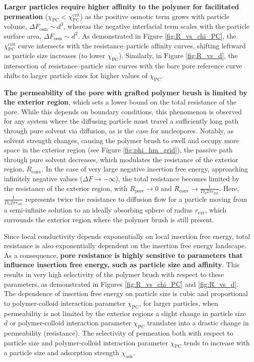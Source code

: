 \documentclass[12pt, a4paper]{article}
\begin{document}
\textbf{Larger particles require higher affinity to the polymer for facilitated permeation} ($\chi_{\text{PC}} < \chi^{\text{crit}}_{\text{PC}}$) as the positive osmotic term grows with particle volume, $\Delta F_{\text{osm}} \sim d^3$, whereas the negative interfacial term scales with the particle surface area, $\Delta F_{\text{osm}} \sim d^2$.
As demonstrated in Figure \ref{fig:R_vs_chi_PC}, the $\chi^{\text{crit}}_{\text{PC}}$ curve intersects with the resistance–particle affinity curves, shifting leftward as particle size increases (to lower $\chi_{\text{PC}}$).
Similarly, in Figure \ref{fig:R_vs_d}, the intersection of resistance–particle size curves with the bare pore reference curve shifts to larger particle sizes for higher values of $\chi_{\text{PC}}$.

\textbf{The permeability of the pore with grafted polymer brush is limited by the exterior region}, which sets a lower bound on the total resistance of the pore.
While this depends on boundary conditions, this phenomenon is observed for any system where the diffusing particle must travel a sufficiently long path through pure solvent via diffusion, as is the case for nucleopores.%
Notably, as solvent strength changes, causing the polymer brush to swell and occupy more space in the exterior region (see Figure \ref{fig:phi_hm_grid}), the passive path through pure solvent decreases, which modulates the resistance of the exterior region, $R_{\text{conv}}$.
In the case of very large negative insertion free energy, approaching infinitely negative values ($\Delta F \to -\infty$), the total resistance becomes limited by the resistance of the exterior region, with $R_{\text{pore}} \to 0$ and $R_{\text{conv}} \to \frac{1}{D_0 2 \pi r_{\text{ext}}}$.
Here, $\frac{1}{D_0 2 \pi r_{\text{ext}}}$ represents twice the resistance to diffusion flow for a particle moving from a semi-infinite solution to an ideally absorbing sphere of radius $r_{\text{ext}}$, which surrounds the exterior region where the polymer brush is still present.

Since local conductivity depends exponentially on local insertion free energy, total resistance is also exponentially dependent on the insertion free energy landscape.
As a consequence, \textbf{pore resistance is highly sensitive to parameters that influence insertion free energy, such as particle size and affinity}.
This results in very high selectivity of the polymer brush with respect to these parameters, as demonstrated in Figures \ref{fig:R_vs_chi_PC} and \ref{fig:R_vs_d}.
The dependence of insertion free energy on particle size is cubic and proportional to polymer-colloid interaction parameter $\chi_{\text{PC}}$, for larger particles, when permeability is not limited by the exterior regions a slight change in particle size $d$ or polymer-colloid interaction parameter $\chi_{\text{PC}}$ translates into a drastic change in permeability (resistance).
The selectivity of permeation both with respect to particle size and polymer-colloid interaction parameter $\chi_{\text{PC}}$ tends to increase with a particle size and adsorption strength $\chi_{\text{ads}}$.
\end{document}
